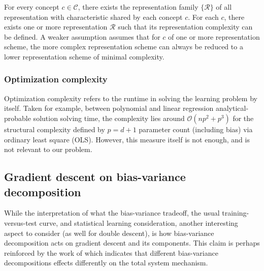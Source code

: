 \documentclass[10pt]{article}
\begin{document}
\begin{assumption}
    For every concept $c\in\mathcal{C}$, there exists the representation family $\{\mathcal{R}\}$ of all representation with characteristic shared by each concept $c$. For each $c$, there exists one or more representation $\mathcal{R}$ such that its representation complexity can be defined. A weaker assumption assumes that for $c$ of one or more representation scheme, the more complex representation scheme can always be reduced to a lower representation scheme of minimal complexity.
\end{assumption}
\subsubsection{Optimization complexity}

Optimization complexity refers to the runtime in solving the learning problem by itself. Taken for example, between polynomial and linear regression analytical-probable solution solving time, the complexity lies around $\mathcal{O}(np^{2}+p^{3})$ for the structural complexity defined by $p=d+1$ parameter count (including bias) via ordinary least square (OLS). However, this measure itself is not enough, and is not relevant to our problem. 

\subsection{Gradient descent on bias-variance decomposition}

While the interpretation of what the bias-variance tradeoff, the usual training-versus-test curve, and statistical learning consideration, another interesting aspect to consider (as well for double descent), is how bias-variance decomposition acts on gradient descent and its components. This claim is perhaps reinforced by the work of \cite{adlam2020understandingdoubledescentrequires} which indicates that different bias-variance decompositions effects differently on the total system mechanism. 
\end{document}
